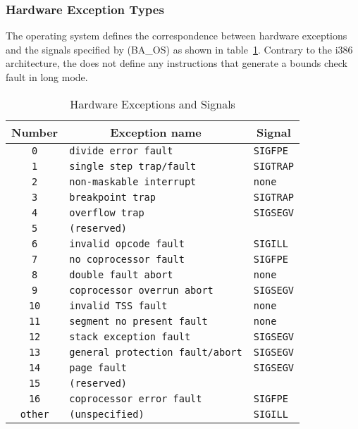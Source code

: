 \subsubsection{Hardware Exception Types}
The operating system defines the correspondence between hardware
exceptions and the signals specified by (BA\_OS)
as shown in table~\ref{tab-hw-exceptions}. Contrary to the i386
architecture, the \xARCH does not define any instructions that
generate a bounds check fault in long mode.

\begin{table}
\Hrule
  \caption{Hardware Exceptions and Signals}
  \label{tab-hw-exceptions}
  \begin{center}
    \begin{tabular}[t]{c|l|l}
      \multicolumn{1}{c}{Number} & \multicolumn{1}{c}{Exception name}
         & \multicolumn{1}{c}{Signal}\\
      \hline
      \texttt{0} & \texttt{divide error fault} & \texttt{SIGFPE} \\
      \texttt{1} & \texttt{single step trap/fault} & \texttt{SIGTRAP} \\
      \texttt{2} & \texttt{non-maskable interrupt} & \texttt{none} \\
      \texttt{3} & \texttt{breakpoint trap} & \texttt{SIGTRAP} \\
      \texttt{4} & \texttt{overflow trap} & \texttt{SIGSEGV} \\
      \texttt{5} & \texttt{(reserved)} &\\
      \texttt{6} & \texttt{invalid opcode fault} & \texttt{SIGILL} \\
      \texttt{7} & \texttt{no coprocessor fault} & \texttt{SIGFPE} \\
      \texttt{8} & \texttt{double fault abort} & \texttt{none} \\
      \texttt{9} & \texttt{coprocessor overrun abort} & \texttt{SIGSEGV} \\
      \texttt{10} & \texttt{invalid TSS fault} & \texttt{none} \\
      \texttt{11} & \texttt{segment no present fault} & \texttt{none} \\
      \texttt{12} & \texttt{stack exception fault} & \texttt{SIGSEGV} \\
      \texttt{13} & \texttt{general protection fault/abort}&\texttt{SIGSEGV} \\
      \texttt{14} & \texttt{page fault} & \texttt{SIGSEGV} \\
      \texttt{15} & \texttt{(reserved)} &\\
      \texttt{16} & \texttt{coprocessor error fault} & \texttt{SIGFPE} \\
      \texttt{other} & \texttt{(unspecified)} & \texttt{SIGILL}
    \end{tabular}
  \end{center}
\Hrule
\end{table}

